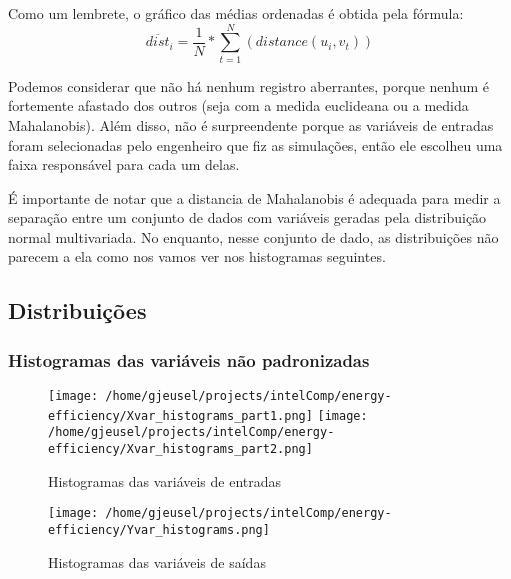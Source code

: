 \documentclass[paper=a4, fontsize=11pt]{article} %
\numberwithin{equation}{section} %
\numberwithin{figure}{section} %
\numberwithin{table}{section} %
\begin{document}
Como um lembrete, o gráfico das médias ordenadas é obtida pela fórmula:
\begin{equation}
\overline{dist}_i = \frac{1}{N}*\sum_{t=1}^{N} (distance(u_i, v_t))
\end{equation}

Podemos considerar que não há nenhum registro aberrantes, porque nenhum é fortemente afastado dos outros (seja com a medida euclideana ou a medida Mahalanobis).
Além disso, não é surpreendente porque as variáveis de entradas foram selecionadas pelo engenheiro que fiz as simulações, então ele escolheu uma faixa responsável para cada um delas.

É importante de notar que a distancia de Mahalanobis é adequada para medir a separação entre um conjunto de dados com
variáveis geradas pela distribuição normal multivariada.
No enquanto, nesse conjunto de dado, as distribuições não parecem a ela como nos vamos ver nos histogramas seguintes.


\subsection{Distribuições}

\subsubsection{Histogramas das variáveis não padronizadas}

  \begin{figure}[H] %
  \begin{center}
  \texttt{[image: /home/gjeusel/projects/intelComp/energy-efficiency/Xvar\_histograms\_part1.png]}
  \texttt{[image: /home/gjeusel/projects/intelComp/energy-efficiency/Xvar\_histograms\_part2.png]}
  \end{center}
  \caption{Histogramas das variáveis de entradas}
  \label{hist_X}
  \end{figure}

  \begin{figure}[H] %
  \begin{center}
  \texttt{[image: /home/gjeusel/projects/intelComp/energy-efficiency/Yvar\_histograms.png]}
  \end{center}
  \caption{Histogramas das variáveis de saídas}
  \label{hist_Y}
  \end{figure}
\end{document}
